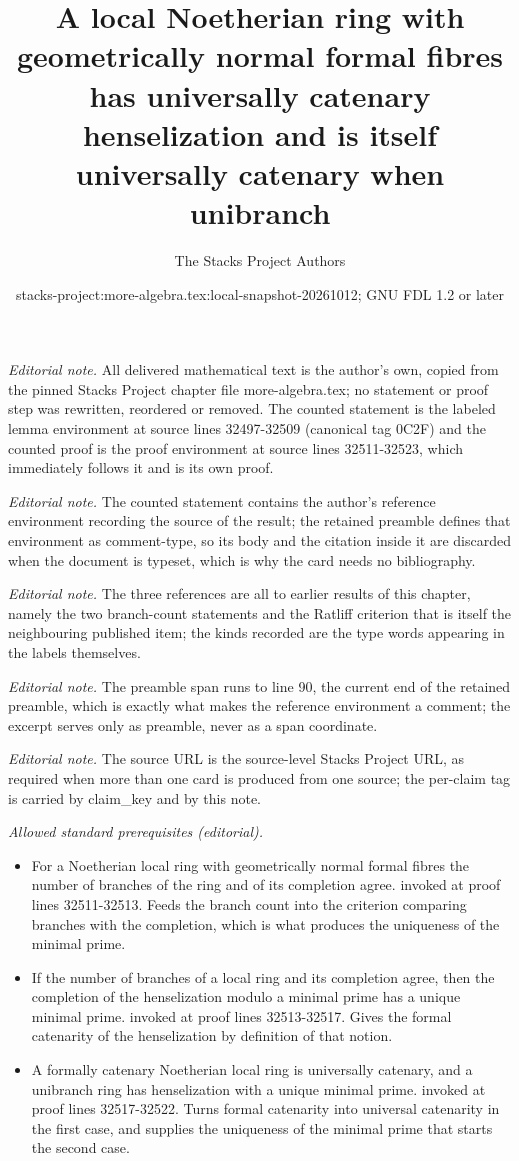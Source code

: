 \documentclass[10pt,a4paper]{amsart}
\title{A local Noetherian ring with geometrically normal formal fibres has universally catenary henselization and is itself universally catenary when unibranch}
\author{The Stacks Project Authors}
\date{stacks-project:more-algebra.tex:local-snapshot-20261012; GNU FDL 1.2 or later}
\theoremstyle{plain}
\theoremstyle{definition}
\theoremstyle{remark}
\numberwithin{equation}{subsection}
\begin{document}
\maketitle
\setcounter{subsection}{1}
\noindent\textit{Editorial note.} All delivered mathematical text is the author's own, copied from the pinned Stacks Project chapter file more-algebra.tex; no statement or proof step was rewritten, reordered or removed. The counted statement is the labeled lemma environment at source lines 32497-32509 (canonical tag 0C2F) and the counted proof is the proof environment at source lines 32511-32523, which immediately follows it and is its own proof.\par\medskip
\noindent\textit{Editorial note.} The counted statement contains the author's reference environment recording the source of the result; the retained preamble defines that environment as comment-type, so its body and the citation inside it are discarded when the document is typeset, which is why the card needs no bibliography.\par\medskip
\noindent\textit{Editorial note.} The three references are all to earlier results of this chapter, namely the two branch-count statements and the Ratliff criterion that is itself the neighbouring published item; the kinds recorded are the type words appearing in the labels themselves.\par\medskip
\noindent\textit{Editorial note.} The preamble span runs to line 90, the current end of the retained preamble, which is exactly what makes the reference environment a comment; the excerpt serves only as preamble, never as a span coordinate.\par\medskip
\noindent\textit{Editorial note.} The source URL is the source-level Stacks Project URL, as required when more than one card is produced from one source; the per-claim tag is carried by claim\_key and by this note.\par\medskip
\noindent\textit{Allowed standard prerequisites (editorial).}\begin{itemize}
\item For a Noetherian local ring with geometrically normal formal fibres the number of branches of the ring and of its completion agree. invoked at proof lines 32511-32513. Feeds the branch count into the criterion comparing branches with the completion, which is what produces the uniqueness of the minimal prime.
\item If the number of branches of a local ring and its completion agree, then the completion of the henselization modulo a minimal prime has a unique minimal prime. invoked at proof lines 32513-32517. Gives the formal catenarity of the henselization by definition of that notion.
\item A formally catenary Noetherian local ring is universally catenary, and a unibranch ring has henselization with a unique minimal prime. invoked at proof lines 32517-32522. Turns formal catenarity into universal catenarity in the first case, and supplies the uniqueness of the minimal prime that starts the second case.
\end{itemize}\medskip
\end{document}
